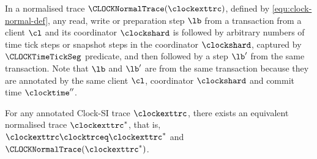 In a normalised trace \( \CLOCKNormalTrace(\clockexttrc) \), defined by \cref{equ:clock-normal-def},
any read, write or preparation step \( \lb \) from a transaction from a client \( \cl \) and its coordinator \( \clockshard \)
is followed by arbitrary numbers of time tick steps or snapshot steps in the coordinator \( \clockshard \), 
captured by \( \CLOCKTimeTickSeg \) predicate,
and then followed by a step \( \lb' \) from the same transaction.
Note that \( \lb \) and \( \lb' \) are from the same transaction 
because they are annotated by the same client \( \cl \), coordinator \( \clockshard \) and commit time \( \clocktime'' \).


\begin{theorem}
\label{thm:clock-si-normalised-trace}
For any annotated Clock-SI trace \( \clockexttrc\),
there exists an equivalent normalised trace \( \clockexttrc^*\),
that is, \( \clockexttrc \clocktrceq \clockexttrc^*\) and \( \CLOCKNormalTrace(\clockexttrc^*) \).
\end{theorem}

